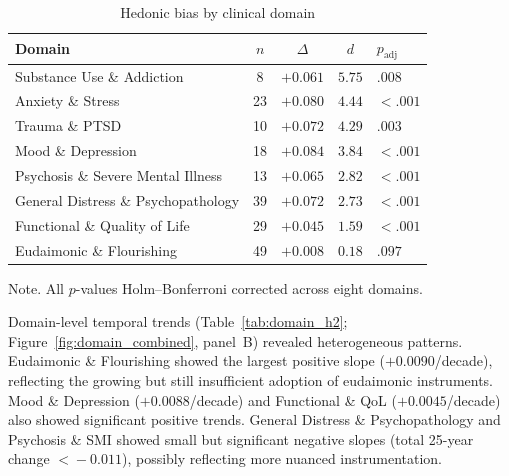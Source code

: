 \documentclass[12pt,a4paper]{article}
\newcommand{\floatnote}[1]{\par\vspace{4pt}\begin{minipage}{\linewidth}\small\textnormal{Note. #1}\end{minipage}}
\begin{document}
\begin{table}[H]
\caption{Hedonic bias by clinical domain}
\label{tab:domain_h1}
\small
\begin{tabular}{lcccl}
\toprule
\textbf{Domain} & \textbf{$n$} & \textbf{$\Delta$} & \textbf{$d$} & \textbf{$p_{\text{adj}}$} \\
\midrule
Substance Use \& Addiction                         &  8 & $+0.061$ & $5.75$ & $.008$ \\
Anxiety \& Stress                                  & 23 & $+0.080$ & $4.44$ & $< .001$ \\
Trauma \& PTSD                                     & 10 & $+0.072$ & $4.29$ & $.003$ \\
Mood \& Depression                                 & 18 & $+0.084$ & $3.84$ & $< .001$ \\
Psychosis \& Severe Mental Illness                 & 13 & $+0.065$ & $2.82$ & $< .001$ \\
General Distress \& Psychopathology                & 39 & $+0.072$ & $2.73$ & $< .001$ \\
Functional \& Quality of Life                      & 29 & $+0.045$ & $1.59$ & $< .001$ \\
Eudaimonic \& Flourishing                          & 49 & $+0.008$ & $0.18$ & $.097$ \\
\bottomrule
\end{tabular}
\floatnote{All $p$-values Holm--Bonferroni corrected across eight domains.}
\end{table}

Domain-level temporal trends (Table~\ref{tab:domain_h2}; Figure~\ref{fig:domain_combined}, panel~B) revealed heterogeneous patterns.
Eudaimonic \& Flourishing showed the largest positive slope ($+0.0090$/decade), reflecting the growing but still insufficient adoption of eudaimonic instruments.
Mood \& Depression ($+0.0088$/decade) and Functional \& QoL ($+0.0045$/decade) also showed significant positive trends.
General Distress \& Psychopathology and Psychosis \& SMI showed small but significant negative slopes (total 25-year change $<\!-0.011$), possibly reflecting more nuanced instrumentation.
\end{document}
